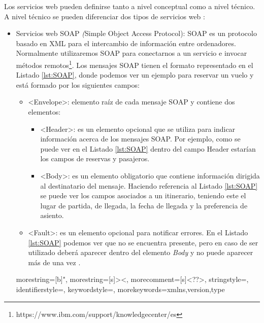 Los servicios web pueden definirse tanto a nivel conceptual como a nivel técnico. A nivel técnico se pueden diferenciar dos tipos de servicios web \citep{TorresJoaquin2017SC}:
\begin{itemize}
	\item Servicios web SOAP \textit({Simple Object Access Protocol}): SOAP es un protocolo basado en XML para el intercambio de información entre ordenadores. Normalmente utilizaremos SOAP para conectarnos a un servicio e invocar métodos remotos\footnote{https://www.ibm.com/support/knowledgecenter/es}. Los mensajes SOAP tienen el formato representado en el Listado \ref{lst:SOAP}, donde podemos ver un ejemplo para reservar un vuelo y está formado por los siguientes campos:
	
		\begin{itemize}
		\item <Envelope>: elemento raíz de cada mensaje SOAP y contiene dos elementos: 
			\begin{itemize}
			\item <Header>: es un elemento opcional que se utiliza para indicar información acerca de los mensajes SOAP. Por ejemplo, como se puede ver en el Listado \ref{lst:SOAP} dentro del campo Header estarían los campos de reservas y pasajeros.
			\item <Body>: es un elemento obligatorio que contiene información dirigida al destinatario del mensaje. Haciendo referencia al Listado \ref{lst:SOAP} se puede ver los campos asociados a un itinerario, teniendo este el lugar de partida, de llegada, la fecha de llegada y la preferencia de asiento.
		\end{itemize}
		\item <Fault>: es un elemento opcional para notificar errores. En el Listado \ref{lst:SOAP} podemos ver que no se encuentra presente, pero en caso de ser utilizado deberá aparecer dentro del elemento \textit{Body} y no puede aparecer más de una vez .
		
	\end{itemize}
	
	
	
	
	
	{
		morestring=[b]",
		morestring=[s]{>}{<},
		morecomment=[s]{<?}{?>},
		stringstyle=\color{black},
		identifierstyle=\color{darkblue},
		keywordstyle=\color{purple},
		morekeywords={xmlns,version,type}%
	}
	

\end{itemize}
